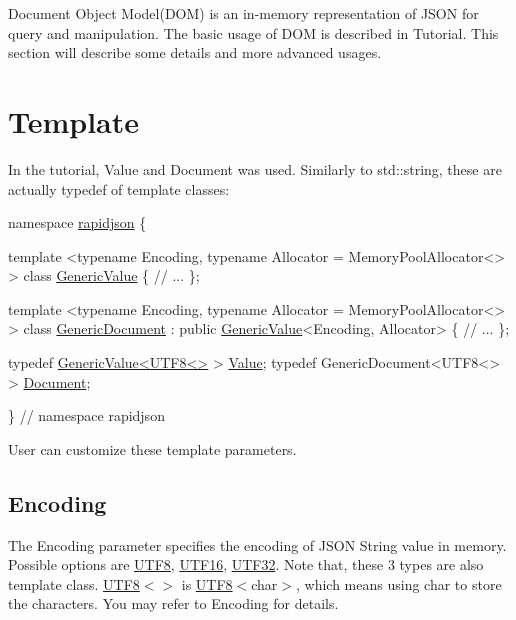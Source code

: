 Document Object Model(\+D\+O\+M) is an in-\/memory representation of J\+S\+ON for query and manipulation. The basic usage of D\+OM is described in Tutorial. This section will describe some details and more advanced usages.\hypertarget{md_Commun_Externe_RapidJSON_doc_dom.zh-cn_Template}{}\section{Template}\label{md_Commun_Externe_RapidJSON_doc_dom.zh-cn_Template}
In the tutorial, {\ttfamily Value} and {\ttfamily Document} was used. Similarly to {\ttfamily std\+::string}, these are actually {\ttfamily typedef} of template classes\+:


\begin{DoxyCode}
\textcolor{keyword}{namespace }\hyperlink{namespacerapidjson}{rapidjson} \{

\textcolor{keyword}{template} <\textcolor{keyword}{typename} Encoding, \textcolor{keyword}{typename} Allocator = MemoryPoolAllocator<> >
\textcolor{keyword}{class }\hyperlink{class_generic_value}{GenericValue} \{
    \textcolor{comment}{// ...}
\};

\textcolor{keyword}{template} <\textcolor{keyword}{typename} Encoding, \textcolor{keyword}{typename} Allocator = MemoryPoolAllocator<> >
\textcolor{keyword}{class }\hyperlink{class_generic_document}{GenericDocument} : \textcolor{keyword}{public} \hyperlink{class_generic_value}{GenericValue}<Encoding, Allocator> \{
    \textcolor{comment}{// ...}
\};

\textcolor{keyword}{typedef} \hyperlink{class_generic_value}{GenericValue<UTF8<>} > \hyperlink{document_8h_a071cf97155ba72ac9a1fc4ad7e63d481}{Value};
\textcolor{keyword}{typedef} GenericDocument<UTF8<> > \hyperlink{document_8h_ac6ea5b168e3fe8c7fa532450fc9391f7}{Document};

\} \textcolor{comment}{// namespace rapidjson}
\end{DoxyCode}


User can customize these template parameters.\hypertarget{md_Commun_Externe_RapidJSON_doc_dom.zh-cn_Encoding}{}\subsection{Encoding}\label{md_Commun_Externe_RapidJSON_doc_dom.zh-cn_Encoding}
The {\ttfamily Encoding} parameter specifies the encoding of J\+S\+ON String value in memory. Possible options are {\ttfamily \hyperlink{struct_u_t_f8}{U\+T\+F8}}, {\ttfamily \hyperlink{struct_u_t_f16}{U\+T\+F16}}, {\ttfamily \hyperlink{struct_u_t_f32}{U\+T\+F32}}. Note that, these 3 types are also template class. {\ttfamily \hyperlink{struct_u_t_f8}{U\+T\+F8}$<$$>$} is {\ttfamily \hyperlink{struct_u_t_f8}{U\+T\+F8}$<$char$>$}, which means using char to store the characters. You may refer to Encoding for details.

